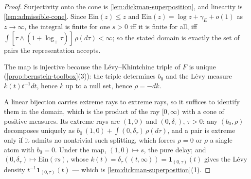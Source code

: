 \begin{proof}
Surjectivity onto the cone is \ref{lem:dickman-superposition}, and linearity is
\ref{lem:admissible-cone}. Since $\mathrm{Ein}(z) \le z$ and
$\mathrm{Ein}(z) = \log z + \gamma_E + o(1)$ as $z \to \infty$, the integral is finite for one
$s > 0$ iff it is finite for all, iff $\int [\tau \wedge (1 + \log_+\tau)]\,\rho(d\tau) <
\infty$; so the stated domain is exactly the set of pairs the representation accepts.

The map is injective because
the L\'evy--Khintchine triple of $F$ is unique (\ref{prop:bernstein-toolbox}(3)): the triple
determines $b_0$ and the L\'evy measure $k(t)t^{-1}dt$, hence $k$ up to a null set, hence
$\rho = -dk$.

A linear bijection carries extreme rays to extreme rays, so it suffices to identify them in the
domain, which is the product of the ray $[0,\infty)$ with a cone of positive measures. Its
extreme rays are $(1, 0)$ and $(0, \delta_\tau)$, $\tau > 0$: any $(b_0, \rho)$ decomposes
uniquely as $b_0\,(1,0) + \int (0,\delta_\tau)\,\rho(d\tau)$, and a pair is extreme only if it
admits no nontrivial such splitting, which forces $\rho = 0$ or $\rho$ a single atom with
$b_0 = 0$. Under the map, $(1,0) \mapsto s$, the pure delay; and $(0, \delta_\tau) \mapsto
\mathrm{Ein}(\tau s)$, whose $k(t) = \delta_\tau((t,\infty)) = \mathbf{1}_{(0,\tau)}(t)$ gives
the L\'evy density $t^{-1}\mathbf{1}_{(0,\tau)}(t)$ --- which is \ref{lem:dickman-superposition}(1).
\end{proof}

